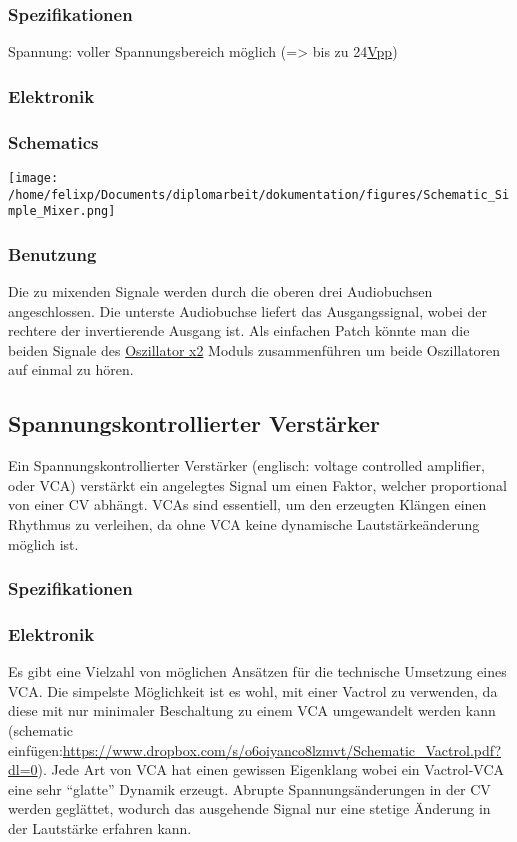 \subsubsection{Spezifikationen}
\label{sec:org24aba89}
Spannung: voller Spannungsbereich möglich (=> bis zu 24\href{file:///home/felixp/Documents/diplomarbeit/dokumentation/content/hauptteil.org}{Vpp})
\subsubsection{Elektronik}
\label{sec:org56f2dac}
\subsubsection{Schematics}
\label{sec:orgc5a71c4}
\begin{center}
\texttt{[image: /home/felixp/Documents/diplomarbeit/dokumentation/figures/Schematic\_Simple\_Mixer.png]}
\end{center}
\subsubsection{Benutzung}
\label{sec:orgb89eb20}
Die zu mixenden Signale werden durch die oberen drei Audiobuchsen angeschlossen. Die unterste Audiobuchse liefert das Ausgangssignal, wobei der rechtere der invertierende Ausgang ist. Als einfachen Patch könnte man die beiden Signale des \href{modules/oscillator.org}{Oszillator x2} Moduls zusammenführen um beide Oszillatoren auf einmal zu hören.

\subsection{Spannungskontrollierter Verstärker}
\label{sec:orga8db834}
Ein Spannungskontrollierter Verstärker (englisch: voltage controlled amplifier, oder VCA) verstärkt ein angelegtes Signal um einen Faktor, welcher proportional von einer \acl{CV} abhängt. \acp{VCA} sind essentiell, um den erzeugten Klängen einen Rhythmus zu verleihen, da ohne \ac{VCA} keine dynamische Lautstärkeänderung möglich ist. 
\subsubsection{Spezifikationen}
\label{sec:orgc5790de}
\subsubsection{Elektronik}
\label{sec:orgb9a2ca6}
Es gibt eine Vielzahl von möglichen Ansätzen für die technische Umsetzung eines \ac{VCA}. Die simpelste Möglichkeit ist es wohl, mit einer Vactrol zu verwenden, da diese mit nur minimaler Beschaltung zu einem VCA umgewandelt werden kann (schematic einfügen:\url{https://www.dropbox.com/s/o6oiyanco8lzmvt/Schematic\_Vactrol.pdf?dl=0}). Jede Art von \ac{VCA} hat einen gewissen Eigenklang wobei ein Vactrol-VCA eine sehr "`glatte"' Dynamik erzeugt. Abrupte Spannungsänderungen in der \acl{CV} werden geglättet, wodurch das ausgehende Signal nur eine stetige Änderung in der Lautstärke erfahren kann.

